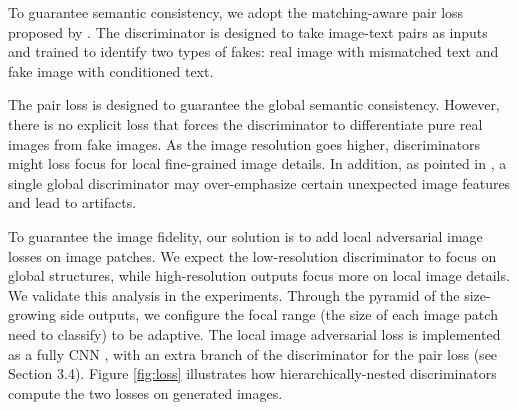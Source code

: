 \documentclass[10pt,twocolumn,letterpaper]{article}
\begin{document}
To guarantee semantic consistency, we adopt the matching-aware pair loss proposed by \cite{reed2016generative}. The discriminator is designed to take image-text pairs as inputs and trained to identify two types of fakes: real image with mismatched text and fake image with conditioned text.

The pair loss is designed to guarantee the global semantic consistency. However, there is no explicit loss that forces the discriminator to differentiate pure real images from fake images. As the image resolution goes higher, discriminators might loss focus for local fine-grained image details.
In addition, as pointed in \cite{shrivastava2016learning}, a single global discriminator may over-emphasize certain unexpected image features and lead to artifacts. 

To guarantee the image fidelity, our solution is to add local adversarial image losses on image patches. 
%
We expect the low-resolution discriminator to focus on global structures, while high-resolution outputs focus more on local image details. We validate this analysis in the experiments. Through the pyramid of the size-growing side outputs, we configure the focal range (the size of each image patch need to classify) to be adaptive.
The local image adversarial loss is implemented as a fully CNN \cite{shrivastava2016learning,zhu2017unpaired},  with an extra branch of the discriminator for the pair loss (see Section 3.4).
Figure \ref{fig:loss} illustrates how hierarchically-nested discriminators compute the two losses on generated images. 
\end{document}
